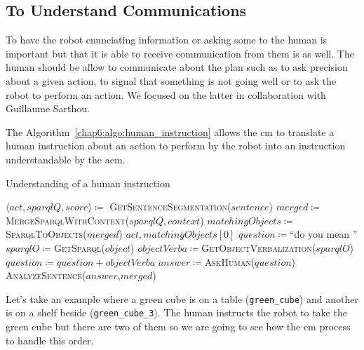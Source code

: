 \documentclass[a4paper,11pt,twoside]{StyleThese}
\begin{document}
\subsection{To Understand Communications}
To have the robot enunciating information or asking some to the human is important but that it is able to receive communication from them is as well. The human should be allow to communicate about the plan such as to ask precision about a given action, to signal that something is not going well or to ask the robot to perform an action. We focused on the latter in collaboration with Guillaume Sarthou. 

The Algorithm~\ref{chap6:algo:human_instruction} allows the \acrshort{cm} to translate a human instruction about an action to perform by the robot into an instruction understandable by the \acrlong{aem}. 

\begin{algorithm}[!htb]
	\caption{Understanding of a human instruction}
	\label{chap6:algo:human_instruction}
	\begin{algorithmic}
		\State $\langle act, sparqlQ, score \rangle \coloneqq$ \textsc{GetSentenceSegmentation($sentence$)} 
		\State $merged \coloneqq$\textsc{MergeSparqlWithContext}($sparqlQ,context$)
		\State $matchingObjects \coloneqq$ \textsc{SparqlToObjects}($merged$)
		\State \Return $act,matchingObjects[0]$
		\Else
		\State $question \coloneqq$``do you mean ''
		\State $sparqlO \coloneqq$\textsc{GetSparql($object$)}
		\State $objectVerba \coloneqq$\textsc{GetObjectVerbalization($sparqlO$)}
		\State $question \coloneqq question + objectVerba$
		\EndFor
		\State $answer \coloneqq$\textsc{AskHuman}($question$)
		\State \textsc{AnalyzeSentence}($answer$,$merged$)
		\EndIf
		\EndIf
		\EndFunction
	\end{algorithmic}
\end{algorithm}		

Let's take an example where a green cube is on a table (\verb'green_cube') and another is on a shelf beside (\verb'green_cube_3'). The human instructs the robot to take the green cube but there are two of them so we are going to see how the \acrshort{cm} process to handle this order. 
\end{document}
